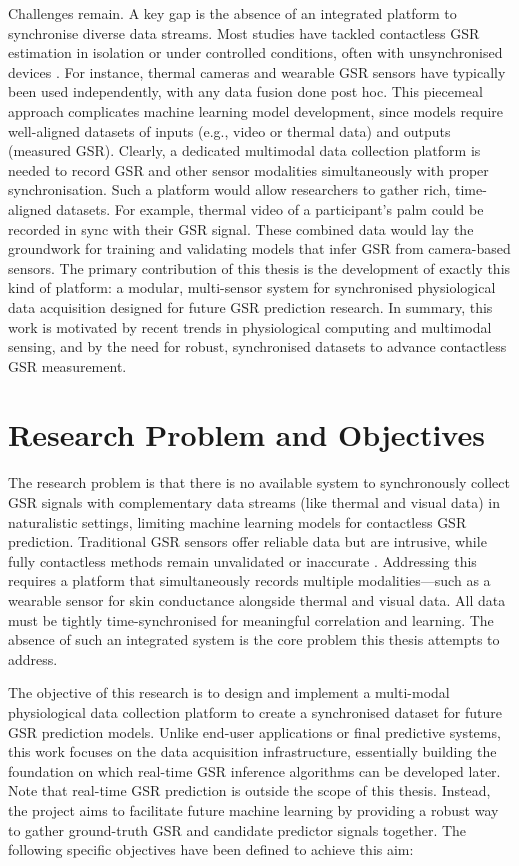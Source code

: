 Challenges remain. A key gap is the absence of an integrated platform to synchronise diverse data streams. Most studies have tackled contactless GSR estimation in isolation or under controlled conditions, often with unsynchronised devices \cite{ref7}. For instance, thermal cameras and wearable GSR sensors have typically been used independently, with any data fusion done post hoc. This piecemeal approach complicates machine learning model development, since models require well-aligned datasets of inputs (e.g., video or thermal data) and outputs (measured GSR). Clearly, a dedicated multimodal data collection platform is needed to record GSR and other sensor modalities simultaneously with proper synchronisation. Such a platform would allow researchers to gather rich, time-aligned datasets. For example, thermal video of a participant's palm could be recorded in sync with their GSR signal. These combined data would lay the groundwork for training and validating models that infer GSR from camera-based sensors. The primary contribution of this thesis is the development of exactly this kind of platform: a modular, multi-sensor system for synchronised physiological data acquisition designed for future GSR prediction research. In summary, this work is motivated by recent trends in physiological computing and multimodal sensing, and by the need for robust, synchronised datasets to advance contactless GSR measurement.


\section{Research Problem and Objectives}
The research problem is that there is no available system to synchronously collect GSR signals with complementary data streams (like thermal and visual data) in naturalistic settings, limiting machine learning models for contactless GSR prediction. Traditional GSR sensors offer reliable data but are intrusive, while fully contactless methods remain unvalidated or inaccurate \cite{ref8}. Addressing this requires a platform that simultaneously records multiple modalities---such as a wearable sensor for skin conductance alongside thermal and visual data. All data must be tightly time-synchronised for meaningful correlation and learning. The absence of such an integrated system is the core problem this thesis attempts to address.

The objective of this research is to design and implement a multi-modal physiological data collection platform to create a synchronised dataset for future GSR prediction models. Unlike end-user applications or final predictive systems, this work focuses on the data acquisition infrastructure, essentially building the foundation on which real-time GSR inference algorithms can be developed later. Note that real-time GSR prediction is outside the scope of this thesis. Instead, the project aims to facilitate future machine learning by providing a robust way to gather ground-truth GSR and candidate predictor signals together. The following specific objectives have been defined to achieve this aim:

